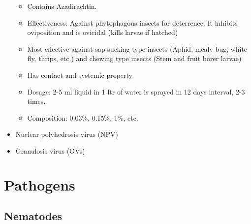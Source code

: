 \documentclass[
  openany]{book}
\providecommand{\tightlist}{%
  \setlength{\itemsep}{0pt}\setlength{\parskip}{0pt}}
\begin{document}
\begin{itemize}
  \begin{itemize}
  \tightlist
  \item
    Contains Azadirachtin.
  \item
    Effectiveness: Against phytophagous insects for deterrence. It inhibits oviposition and is ovicidal (kills larvae if hatched)
  \item
    Most effective against sap sucking type insects (Aphid, mealy bug, white fly, thrips, etc.) and chewing type insects (Stem and fruit borer larvae)
  \item
    Has contact and systemic property
  \item
    Dosage: 2-5 ml liquid in 1 ltr of water is sprayed in 12 days interval, 2-3 times.
  \item
    Composition: 0.03\%, 0.15\%, 1\%, etc.
  \end{itemize}
\item
  Nuclear polyhedrosis virus (NPV)
\item
  Granulosis virus (GVs)
\end{itemize}

\hypertarget{pathogens}{%
\section{Pathogens}\label{pathogens}}

\hypertarget{nematodes}{%
\subsection{Nematodes}\label{nematodes}}
\end{document}
